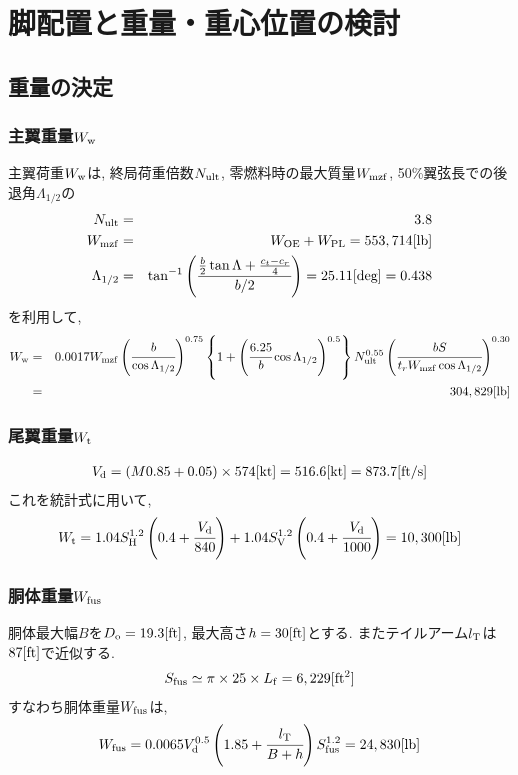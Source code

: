 \documentclass[12pt]{jsarticle}
\begin{document}
\section{脚配置と重量・重心位置の検討}
\subsection{重量の決定}
\subsubsection{主翼重量$W_{\rm w}$}
主翼荷重$W_{\rm w}$は, 終局荷重倍数$N_{\rm ult}$, 零燃料時の最大質量$W_{\rm mzf}$, 50\%翼弦長での後退角$\Lambda_{1/2}$の
\begin{eqnarray*}
N_{\rm ult} &=& 3.8 \\
W_{\rm mzf} &=& W_{\rm OE} + W_{\rm PL} = 553,714 [\rm lb] \\
\Lambda_{1/2} &=& \tan^{-1}\left(\cfrac{\frac{b}{2}\tan\Lambda + \frac{c_t - c_r}{4}}{b/2}\right) = 25.11[\rm deg] = 0.438
\end{eqnarray*}
を利用して,
\begin{eqnarray*}
W_{\rm w} &=& 0.0017W_{\rm mzf}\left(\cfrac{b}{\cos \Lambda_{1/2}}\right)^{0.75} \left\{1+\left(\cfrac{6.25}{b}\cos \Lambda_{1/2}\right)^{0.5}\right\}N_{\rm ult}^{0.55}\left(\cfrac{bS}{t_r W_{\rm mzf} \cos \Lambda_{1/2}}\right)^{0.30} \\
&=& 304,829 [\rm lb]
\end{eqnarray*}

\subsubsection{尾翼重量$W_{\rm t}$}
\begin{eqnarray*}
V_{\rm d} = (M 0.85 + 0.05) \times 574 [\rm kt] = 516.6 [\rm kt] = 873.7 [\rm ft/s]
\end{eqnarray*}
これを統計式に用いて,
\begin{eqnarray*}
W_{\rm t} = 1.04S_{\rm H}^{1.2}\left(0.4 + \cfrac{V_{\rm d}}{840}\right) + 1.04S_{\rm V}^{1.2}\left(0.4 + \cfrac{V_{\rm d}}{1000}\right) = 10,300 [\rm lb]
\end{eqnarray*}

\subsubsection{胴体重量$W_{\rm fus}$}
胴体最大幅$B$を$D_{\rm o} = 19.3[\rm ft]$, 最大高さ$h = 30[\rm ft]$とする. またテイルアーム$l_{\rm T}$は$87[\rm ft]$で近似する.
\begin{eqnarray*}
S_{\rm fus} \simeq \pi \times 25 \times L_{\rm f} = 6,229 [\rm ft^2 ]
\end{eqnarray*}
すなわち胴体重量$W_{\rm fus}$は,
\begin{eqnarray*}
W_{\rm fus} = 0.0065V_{\rm d}^{0.5} \left(1.85 + \cfrac{l_{\rm T}}{B+h}\right) S_{\rm fus}^{1.2} = 24,830 [\rm lb]
\end{eqnarray*}
\end{document}
